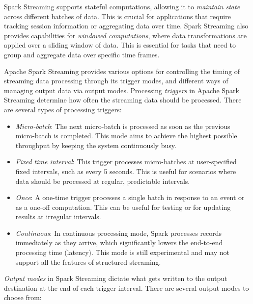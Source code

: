 Spark Streaming supports stateful computations, allowing it to \emph{maintain state} across different batches of data. This is crucial for applications that require tracking session information or aggregating data over time. Spark Streaming also provides capabilities for \emph{windowed computations}, where data transformations are applied over a sliding window of data. This is essential for tasks that need to group and aggregate data over specific time frames.

Apache Spark Streaming provides various options for controlling the timing of streaming data processing through its trigger modes, and different ways of managing output data via output modes. Processing \emph{triggers} in Apache Spark Streaming determine how often the streaming data should be processed. There are several types of processing triggers:

\begin{itemize}
\item \emph{Micro-batch}: The next micro-batch is processed as soon as the previous micro-batch is completed. This mode aims to achieve the highest possible throughput by keeping the system continuously busy.

\item \emph{Fixed time interval}: This trigger processes micro-batches at user-specified fixed intervals, such as every 5 seconds. This is useful for scenarios where data should be processed at regular, predictable intervals.

\item \emph{Once}: A one-time trigger processes a single batch in response to an event or as a one-off computation. This can be useful for testing or for updating results at irregular intervals.

\item \emph{Continuous}: In continuous processing mode, Spark processes records immediately as they arrive, which significantly lowers the end-to-end processing time (latency). This mode is still experimental and may not support all the features of structured streaming.
\end{itemize}

\emph{Output modes} in Spark Streaming dictate what gets written to the output destination at the end of each trigger interval. There are several output modes to choose from:

